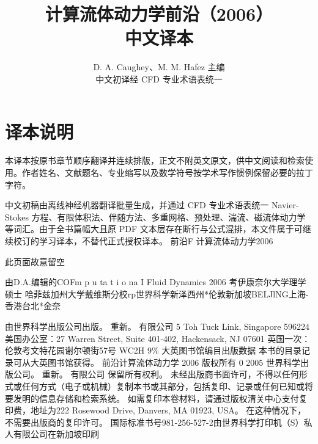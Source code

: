 \documentclass[UTF8,11pt,a4paper,openany,fontset=fandol]{ctexbook}
\title{计算流体动力学前沿（2006）\\[0.45em]\Large 中文译本}
\author{D. A. Caughey、M. M. Hafez 主编\\\small 中文初译经 CFD 专业术语表统一}
\date{}
\begin{document}
\frontmatter
\maketitle
\chapter*{译本说明}
本译本按原书章节顺序翻译并连续排版，正文不附英文原文，供中文阅读和检索使用。作者姓名、文献题名、专业缩写以及数学符号按学术写作惯例保留必要的拉丁字符。

中文初稿由离线神经机器翻译批量生成，并通过 CFD 专业术语表统一 Navier-Stokes 方程、有限体积法、伴随方法、多重网格、预处理、湍流、磁流体动力学等词汇。由于全书篇幅大且原 PDF 文本层存在断行与公式混排，本文件属于可继续校订的学习译本，不替代正式授权译本。
\tableofcontents
\mainmatter
前沿F 计算流体动力学2006

此页面故意留空

由D.A.编辑的COFm p u ta t i o na I Fluid Dynamics 2006 考伊康奈尔大学理学硕士 哈菲兹加州大学戴维斯分校rp世界科学新泽西州*伦敦新加坡BELJlNG上海-香港台北*金奈

由世界科学出版公司出版。 重新。 有限公司 5 Toh Tuck Link, Singapore 596224 美国办公室：27 Warren Street, Suite 401-402, Hackensack, NJ 07601 英国一次：伦敦考文特花园谢尔顿街57号 WC2H 9\% 大英图书馆编目出版数据 本书的目录记录可从大英图书馆获得。 前沿计算流体动力学 2006 版权所有 0 2005 世界科学出版公司。 重新。 有限公司 保留所有权利。 未经出版商书面许可，不得以任何形式或任何方式（电子或机械）复制本书或其部分，包括复印、记录或任何已知或将要发明的信息存储和检索系统。 如需复印本卷材料，请通过版权清关中心支付复印费，地址为222 Rosewood Drive, Danvers, MA 01923, USA。 在这种情况下，不需要出版商的复印许可。 国际标准书号981-256-527-2由世界科学打印机（S）私人有限公司在新加坡印刷
\end{document}
